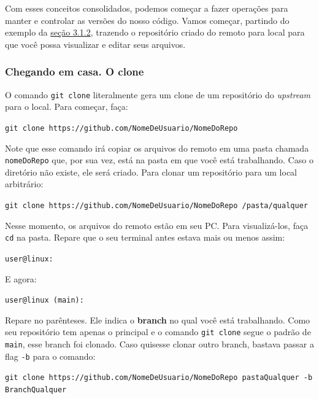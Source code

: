 \documentclass{article}
\begin{document}
  Com esses conceitos consolidados, podemos começar a fazer operações para manter e controlar as versões do nosso código.
  Vamos começar, partindo do exemplo da \href{sec:branches}{seção 3.1.2}, trazendo o repositório criado do remoto para local para que você possa
  visualizar e editar seus arquivos. 

  \subsubsection{Chegando em casa. O clone}
  \label{sec:clone}

  O comando \texttt{git clone} literalmente gera um clone de um repositório do \textit{upstream} para o local. Para começar, faça:
  
  \vspace{1ex}
  \texttt{git clone https://github.com/NomeDeUsuario/NomeDoRepo}
  \vspace{1ex}
  
  Note que esse comando irá copiar os arquivos do remoto em uma pasta chamada \texttt{nomeDoRepo} que, por sua vez, está na pasta
  em que você está trabalhando. Caso o diretório não existe, ele será criado. Para clonar um repositório para um local arbitrário: 

  \vspace{1ex}
  \texttt{git clone https://github.com/NomeDeUsuario/NomeDoRepo /pasta/qualquer}
  \vspace{1ex}

  Nesse momento, os arquivos do remoto estão em seu PC. Para visualizá-los, faça \texttt{cd} na pasta. Repare que o seu terminal 
  antes estava mais ou menos assim:

  \vspace{1ex}
  \texttt{user@linux: ~}
  \vspace{1ex}

  E agora: 

  \vspace{1ex}
  \texttt{user@linux (main): ~}
  \vspace{1ex}

  Repare no parênteses. Ele indica o \textbf{branch} no qual você está trabalhando. Como seu repositório tem apenas o principal e o 
  comando \texttt{git clone} segue o padrão de \texttt{main}, esse branch foi clonado. Caso quisesse clonar outro branch, bastava
  passar a flag \texttt{-b} para o comando: 

  \vspace{1ex}
  \texttt{git clone https://github.com/NomeDeUsuario/NomeDoRepo pastaQualquer -b BranchQualquer}
  \vspace{1ex}
\end{document}
